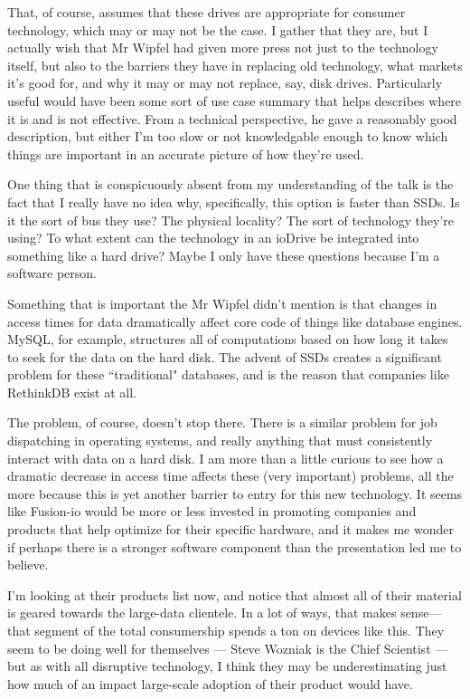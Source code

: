 \documentclass[a4paper]{article}
\begin{document}
That, of course, assumes that these drives are appropriate for consumer technology, which may or may not be the case. I gather that they are, but I actually wish that Mr Wipfel had given more press not just to the technology itself, but also to the barriers they have in replacing old technology, what markets it's good for, and why it may or may not replace, say, disk drives. Particularly useful would have been some sort of use case summary that helps describes where it is and is not effective. From a technical perspective, he gave a reasonably good description, but either I'm too slow or not knowledgable enough to know which things are important in an accurate picture of how they're used.

One thing that is conspicuously absent from my understanding of the talk is the fact that I really have no idea why, specifically, this option is faster than SSDs. Is it the sort of bus they use? The physical locality? The sort of technology they're using? To what extent can the technology in an ioDrive be integrated into something like a hard drive? Maybe I only have these questions because I'm a software person.

Something that is important the Mr Wipfel didn't mention is that changes in access times for data dramatically affect core code of things like database engines. MySQL, for example, structures all of computations based on how long it takes to seek for the data on the hard disk. The advent of SSDs creates a significant problem for these ``traditional" databases, and is the reason that companies like RethinkDB exist at all.

The problem, of course, doesn't stop there. There is a similar problem for job dispatching in operating systems, and really anything that must consistently interact with data on a hard disk. I am more than a little curious to see how a dramatic decrease in access time affects these (very important) problems, all the more because this is yet another barrier to entry for this new technology. It seems like Fusion-io would be more or less invested in promoting companies and products that help optimize for their specific hardware, and it makes me wonder if perhaps there is a stronger software component than the presentation led me to believe.

I'm looking at their products list now, and notice that almost all of their material is geared towards the large-data clientele. In a lot of ways, that makes sense---that segment of the total consumership spends a ton on devices like this. They seem to be doing well for themselves --- Steve Wozniak is the Chief Scientist --- but as with all disruptive technology, I think they may be underestimating just how much of an impact large-scale adoption of their product would have.
\end{document}
